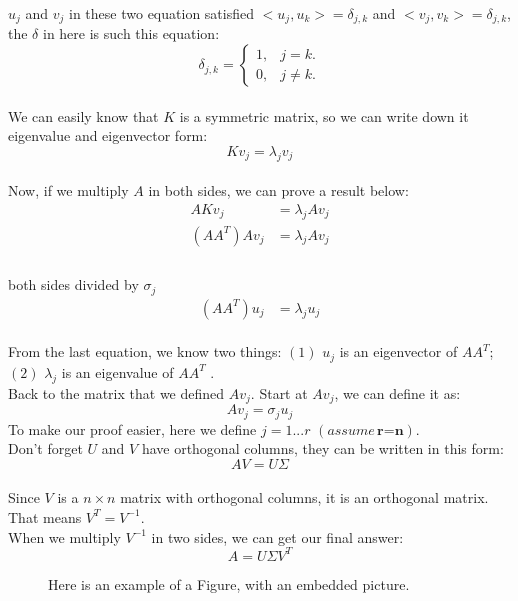\documentclass{article}
\newcommand{\an}[1]{{\leavevmode\color{blue}{#1}}}
\begin{document}
$u_j$ and $v_j$ in these two equation satisfied
 $<u_j, u_k> = \delta_{j,k}$ 
 and 
 $<v_j, v_k> = \delta_{j,k}$, \an{Why is this true?}
 the $\delta$ in here is such this equation:
\begin{equation}
		\delta_{j,k}=\left\{
		\begin{array}{ll}
			1, & \mbox{$j=k$}.\\
			0, & \mbox{$j \neq k$}.
		\end{array}
		\right.
\end{equation}
\\
We can easily know that $K$ is a symmetric matrix, so we can write down it eigenvalue and eigenvector form:
\begin{equation}
	Kv_j = \lambda_j v_j
\end{equation}  
\\
Now, if we multiply $A$ in both sides, we can prove a result below:
\begin{align*}
	AKv_j  &= \lambda_j A v_j \\
	(AA^T)Av_j  &= \lambda_j A v_j \\
\end{align*}
\\
both sides divided by $\sigma_j$
\begin{align*}
	(AA^T)u_j  &= \lambda_j  u_j
\end{align*}
\\
From the last equation, we know two things: $(1)$ $u_j$ is an eigenvector of $AA^T$; $(2)$ $\lambda_j$ is an eigenvalue of $AA^T$ .
\\[2in]
Back to the matrix that we defined $Av_j$. \an{I don't understand what this previous sentence is saying: $A$ is given, you didn't define it.} Start at $Av_j$, we can define it as:
\begin{equation}
	Av_j = \sigma_j u _j
\end{equation}
To make our proof easier, here we define $j = 1 ... r$ $(assume \, \textbf{r=n})$.
\\[3in]
Don't forget $U$ and $V$ have orthogonal columns, \an{You never defined $U$.} they can be written in this form:
\begin{equation}
	AV = U \Sigma
\end{equation}
\\
Since $V$ is a $n \times n$ matrix with orthogonal columns, it is an orthogonal  matrix. That means $V^T = V^{-1}$.
\\
When we multiply $V^{-1}$ in two sides, we can get our final answer:
\begin{equation}
	A = U \Sigma V^T 
\end{equation} 



\begin{figure}[htbp]
	\caption{Here is an example of a Figure, with an embedded picture.}
\end{figure}
\end{document}
